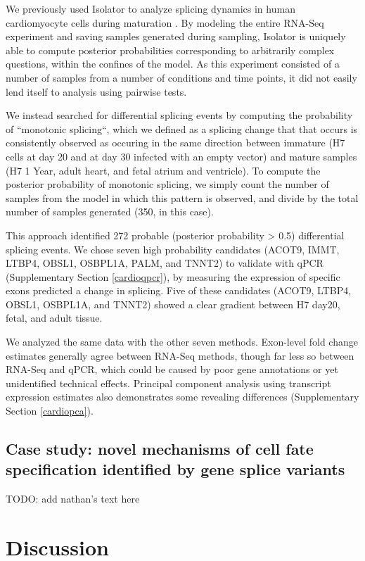 \documentclass[twocolumn]{article}
\begin{document}
We previously used Isolator to analyze splicing dynamics in human cardiomyocyte
cells during maturation \cite{Kuppusamy:2015ey}. By modeling the entire RNA-Seq
experiment and saving samples generated during sampling, Isolator is uniquely
able to compute posterior probabilities corresponding to arbitrarily complex
questions, within the confines of the model. As this experiment consisted of
a number of samples from a number of conditions and time points, it did not
easily lend itself to analysis using pairwise tests.

We instead searched for differential splicing events by computing the
probability of ``monotonic splicing``, which we defined as a splicing change
that that occurs is consistently observed as occuring in the same direction
between immature (H7 cells at day 20 and at day 30 infected with an empty
vector) and mature samples (H7 1 Year, adult heart, and fetal atrium and
ventricle). To compute the posterior probability of monotonic splicing, we
simply count the number of samples from the model in which this pattern is
observed, and divide by the total number of samples generated (350, in this
case).

This approach identified 272 probable (posterior probability > 0.5) differential
splicing events. We chose seven high probability candidates (ACOT9, IMMT, LTBP4,
OBSL1, OSBPL1A, PALM, and TNNT2) to validate with qPCR (Supplementary Section
\ref{cardioqpcr}), by measuring the expression of specific exons predicted a
change in splicing. Five of these candidates (ACOT9, LTBP4, OBSL1, OSBPL1A, and
TNNT2) showed a clear gradient between H7 day20, fetal, and adult tissue.

We analyzed the same data with the other seven methods. Exon-level fold change
estimates generally agree between RNA-Seq methods, though far less so between
RNA-Seq and qPCR, which could be caused by poor gene annotations or yet
unidentified technical effects. Principal component analysis using transcript
expression estimates also demonstrates some revealing differences (Supplementary
Section \ref{cardiopca}).

\subsection{Case study: novel mechanisms of cell fate specification identified
by gene splice variants}

TODO: add nathan's text here

\section{Discussion}\label{discussion}
\end{document}
